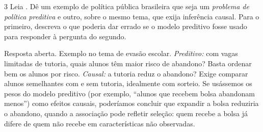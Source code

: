 \documentclass[lista]{tmlnotas}
\begin{document}
\begin{exercicio}{3}
Leia \textcite{kleinberg2015}. Dê um exemplo de política pública brasileira que
seja um \emph{problema de política preditiva} e outro, sobre o mesmo tema, que
exija inferência causal. Para o primeiro, descreva o que poderia dar errado se o
modelo preditivo fosse usado para responder à pergunta do segundo.
\end{exercicio}
\begin{solucao}
Resposta aberta. Exemplo no tema de evasão escolar. \emph{Preditivo:} com
vagas limitadas de tutoria, quais alunos têm maior risco de abandono? Basta
ordenar bem os alunos por risco. \emph{Causal:} a tutoria reduz o abandono?
Exige comparar alunos semelhantes com e sem tutoria, idealmente com sorteio.
Se usássemos os pesos do modelo preditivo (por exemplo, ``alunos que recebem
bolsa abandonam menos'') como efeitos causais, poderíamos concluir que expandir
a bolsa reduziria o abandono, quando a associação pode refletir seleção: quem
recebe a bolsa já difere de quem não recebe em características não observadas.
\end{solucao}
\end{document}
